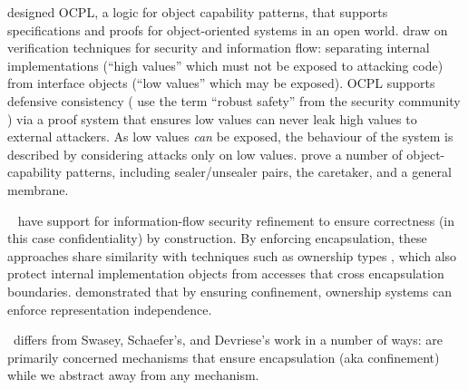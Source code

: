 {\cite{ddd}  designed OCPL, a logic
for object capability patterns, that supports specifications and
proofs for object-oriented systems in an open world.  
draw on verification techniques for security and
information flow: separating internal implementations (``high values''
which must not be exposed to attacking code) from interface objects
(``low values'' which may be exposed).  OCPL supports defensive
consistency %
( use the term ``robust safety'' from the
security community \cite{Bengtson}) via a proof system that ensures
low values can never leak high values to external attackers. 
As low values \textit{can} be exposed,
 the behaviour of the system is described by considering attacks only
on low values.  %
prove a number of object-capability patterns, including
sealer/unsealer pairs, the caretaker, and a general membrane.

\ \cite{schaeferCbC} have
  support for information-flow security %
 refinement to ensure correctness (in this case confidentiality) by
construction. 
By enforcing encapsulation,  %
these approaches share similarity with techniques such as
ownership types \cite{ownalias,NobPotVitECOOP98}, which also
protect internal implementation objects from accesses that cross
encapsulation boundaries.  \cite{Banerjee:2005,encaps} demonstrated that by
ensuring confinement, ownership
systems can enforce representation independence.

 
\Chainmail\ differs from Swasey, Schaefer's, and Devriese's work in a number of ways:
 are primarily concerned  %
mechanisms that ensure encapsulation (aka 
confinement) while we abstract away from any mechanism.

}
